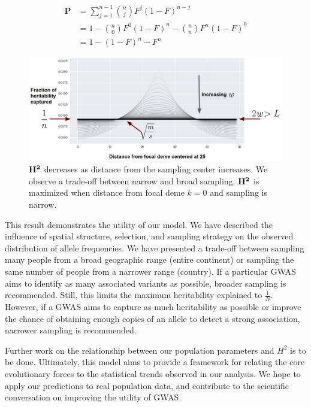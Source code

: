 \begin{equation}\label{eq:psamp}
    \begin{split}
    \textbf{P} &= \sum_{j=1}^{n-1} {n \choose j} F^j (1-F)^{n-j} \\
    &= 1 - {n \choose 0}F^0(1-F)^n - {n \choose n}F^n (1-F)^0 \\
    &= 1- (1-F)^n - F^n
    \end{split}
\end{equation}


\begin{figure}[h]
    \centering
    \hspace*{-1.5cm}
    \includegraphics[scale=0.4]{img/heritability.JPG}
    \caption{$\bf{H^2}$ decreases as distance from the sampling center increases. We observe a trade-off between narrow and broad sampling. $\bf{H^2}$ is maximized when distance from focal deme $k =0$ and sampling is narrow.}
    \label{fig:missing_h}
\end{figure}

This result demonstrates the utility of our model. We have described the influence of spatial structure, selection, and sampling strategy on the observed distribution of allele frequencies. We have presented a trade-off between sampling many people from a broad geographic range (entire continent) or sampling the same number of people from a narrower range (country). If a particular GWAS aims to identify as many associated variants as possible, broader sampling is recommended. Still, this limits the maximum heritability explained to $\frac{1}{N}$. However, if a GWAS aims to capture as much heritability as possible or improve the chance of obtaining enough copies of an allele to detect a strong association, narrower sampling is recommended.


Further work on the relationship between our population parameters and $H^2$ is to be done. Ultimately, this model aims to provide a framework for relating the core evolutionary forces to the statistical trends observed in our analysis. We hope to apply our predictions to real population data, and contribute to the scientific conversation on improving the utility of GWAS.


